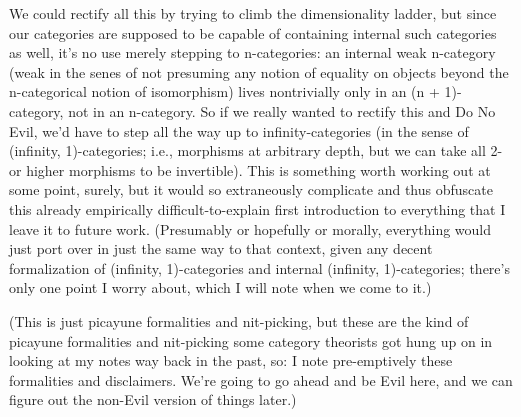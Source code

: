 We could rectify all this by trying to climb the dimensionality ladder, but since our categories are supposed to be capable of containing internal such categories as well, it's no use merely stepping to n-categories: an internal weak n-category (weak in the senes of not presuming any notion of equality on objects beyond the n-categorical notion of isomorphism) lives nontrivially only in an (n + 1)-category, not in an n-category. So if we really wanted to rectify this and Do No Evil, we'd have to step all the way up to infinity-categories (in the sense of (infinity, 1)-categories; i.e., morphisms at arbitrary depth, but we can take all 2- or higher morphisms to be invertible).
This is something worth working out at some point, surely, but it would so extraneously complicate and thus obfuscate this already empirically difficult-to-explain first introduction to everything that I leave it to future work. (Presumably or hopefully or morally, everything would just port over in just the same way to that context, given any decent formalization of (infinity, 1)-categories and internal (infinity, 1)-categories; there's only one point I worry about, which I will note when we come to it.)

(This is just picayune formalities and nit-picking, but these are the kind of picayune formalities and nit-picking some category theorists got hung up on in looking at my notes way back in the past, so: I note pre-emptively these formalities and disclaimers. We're going to go ahead and be Evil here, and we can figure out the non-Evil version of things later.)